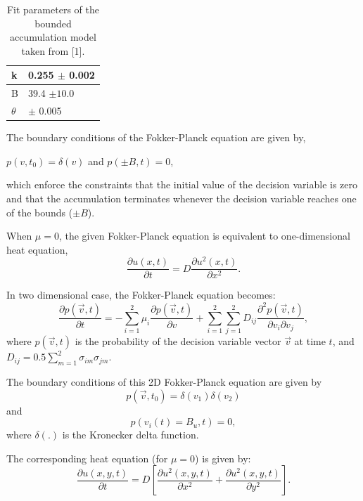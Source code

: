 \documentclass[12pt]{article}		%
\begin{document}
\begin{table}[h]
\begin{center}
    \begin{tabular}{ | l | l |}
    \hline
    k & 0.255 $\pm$ 0.002 \\ \hline
    B & 39.4 $\pm 10.0$ \\ \hline
    $\theta$ & $\pm$ 0.005  \\ \hline
    \end{tabular}
    \caption[Table caption text]{Fit parameters of the bounded accumulation model taken from [1].}
\end{center}
\end{table}

The boundary conditions of the Fokker-Planck equation are given by,
\begin{center}
$p(v, t_0) = \delta (v)$ and $p(\pm B, t) = 0$,
\end{center}
which enforce the constraints that the initial value of the decision variable is zero and that the accumulation terminates whenever the decision variable reaches one of the bounds ($\pm B$).

When $\mu = 0$, the given Fokker-Planck equation is equivalent to one-dimensional heat equation,
\[
	\frac{\partial u(x,t)}{\partial t} = D \frac{\partial u^2(x,t)}{\partial x^2}.
\]

In two dimensional case, the Fokker-Planck equation becomes:
\begin{equation} \label{eq:fp2d}
	\frac{\partial p(\vec{v},t)}{\partial t} = - \sum_{i=1}^{2} \mu_i \frac{\partial p(\vec{v},t)}{\partial v} + \sum_{i=1}^{2} \sum_{j=1}^{2} D_{ij} \frac{\partial^2 p(\vec{v},t)}{\partial v_i \partial v_j},
\end{equation}
where $p(\vec{v}, t)$ is the probability of the decision variable vector $\vec{v}$ at time $t$, and $D_{ij} = 0.5 \sum_{m=1}^{2} \sigma_{im} \sigma_{jm}$.

The boundary conditions of this 2D Fokker-Planck equation are given by 
\[
	p(\vec{v}, t_0) = \delta (v_1) \delta (v_2)
\]
and
\[
	p(v_i(t) = B_u, t) = 0,
\]
where $\delta(.)$ is the Kronecker delta function. 

The corresponding heat equation (for $\mu = 0$) is given by:
\[
	\frac{\partial u(x,y,t)}{\partial t} = D \left[ \frac{\partial u^2(x,y,t)}{\partial x^2} + \frac{\partial u^2(x,y,t)}{\partial y^2} \right].
\]

\newpage
\end{document}
